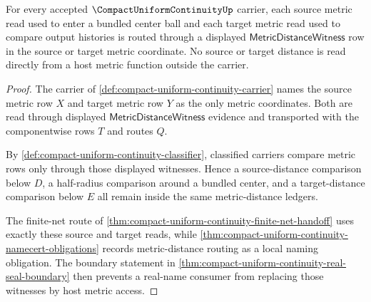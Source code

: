 \begin{theorem}
\label{thm:compact-uniform-continuity-metric-distance-routing}
For every accepted $\CompactUniformContinuityUp$ carrier, each source metric read used to enter a bundled center ball and each target metric read used to compare output histories is routed through a displayed $\mathsf{MetricDistanceWitness}$ row in the source or target metric coordinate. No source or target distance is read directly from a host metric function outside the carrier.
\end{theorem}
\begin{proof}
The carrier of \autoref{def:compact-uniform-continuity-carrier} names the source metric row $X$ and target metric row $Y$ as the only metric coordinates. Both are read through displayed $\mathsf{MetricDistanceWitness}$ evidence and transported with the componentwise rows $T$ and routes $Q$.

By \autoref{def:compact-uniform-continuity-classifier}, classified carriers compare metric rows only through those displayed witnesses. Hence a source-distance comparison below $D$, a half-radius comparison around a bundled center, and a target-distance comparison below $E$ all remain inside the same metric-distance ledgers.

The finite-net route of \autoref{thm:compact-uniform-continuity-finite-net-handoff} uses exactly these source and target reads, while \autoref{thm:compact-uniform-continuity-namecert-obligations} records metric-distance routing as a local naming obligation. The boundary statement in \autoref{thm:compact-uniform-continuity-real-seal-boundary} then prevents a real-name consumer from replacing those witnesses by host metric access.
\end{proof}

